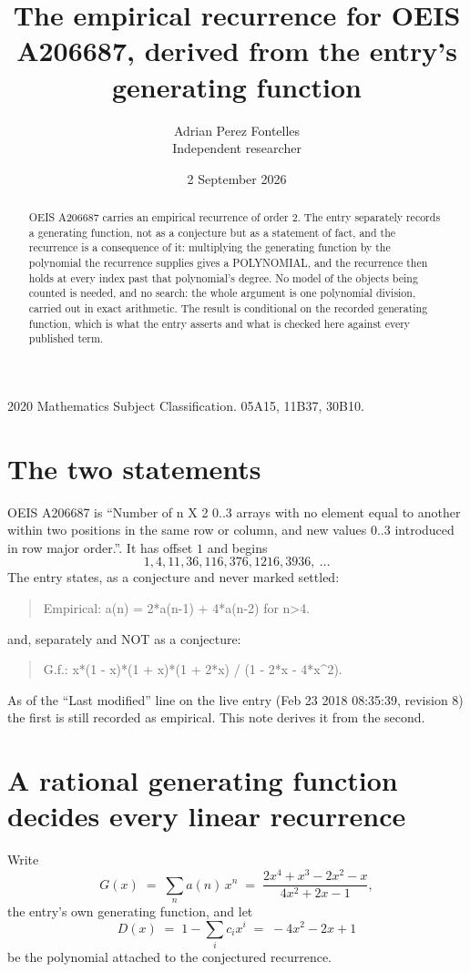 \documentclass[11pt,a4paper]{article}
\title{The empirical recurrence for OEIS A206687, derived from the entry's generating function}
\author{Adrian Perez Fontelles\\ \small Independent researcher}
\date{2 September 2026}
\theoremstyle{plain}
\theoremstyle{definition}
\begin{document}
\maketitle

\begin{abstract}
OEIS A206687 carries an empirical recurrence of order $2$. The entry separately records a
generating function, not as a conjecture but as a statement of fact, and the recurrence is a
consequence of it: multiplying the generating function by the polynomial the recurrence
supplies gives a POLYNOMIAL, and the recurrence then holds at every index past that
polynomial's degree. No model of the objects being counted is needed, and no search: the
whole argument is one polynomial division, carried out in exact arithmetic. The result is
conditional on the recorded generating function, which is what the entry asserts and what is
checked here against every published term.
\end{abstract}

\noindent\small 2020 Mathematics Subject Classification. 05A15, 11B37, 30B10.\normalsize

\section{The two statements}

OEIS A206687 is ``Number of n X 2 0..3 arrays with no element equal to another within two positions in the same row or column, and new values 0..3 introduced in row major order.''. It has offset $1$ and begins
\[
1, 4, 11, 36, 116, 376, 1216, 3936,\ \dots
\]
The entry states, as a conjecture and never marked settled:
\begin{quote}
Empirical: a(n) = 2*a(n-1) + 4*a(n-2) for n>4.
\end{quote}
and, separately and NOT as a conjecture:
\begin{quote}
G.f.: x*(1 - x)*(1 + x)*(1 + 2*x) / (1 - 2*x - 4*x\^{}2).
\end{quote}
As of the ``Last modified'' line on the live entry (Feb 23 2018 08:35:39, revision 8) the first is still
recorded as empirical. This note derives it from the second.

\section{A rational generating function decides every linear recurrence}

Write
\[
G(x)\;=\;\sum_{n}a(n)\,x^{n}\;=\;\frac{2 x^{4} + x^{3} - 2 x^{2} - x}{4 x^{2} + 2 x - 1},
\]
the entry's own generating function, and let
\[
D(x)\;=\;1-\sum_i c_i x^{i}\;=\;- 4 x^{2} - 2 x + 1
\]
be the polynomial attached to the conjectured recurrence.
\end{document}
